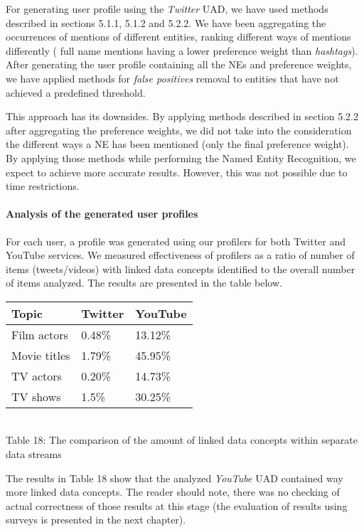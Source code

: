 For generating user profile using the \textit{Twitter} UAD, we have used methods
described in sections 5.1.1, 5.1.2 and 5.2.2. We have been aggregating the occurrences
of mentions of different entities, ranking different ways of mentions differently (\eg
full name mentions having a lower preference weight than \textit{hashtags}). After
generating the user profile containing all the NEs and preference weights, we have
applied methods for \textit{false positives} removal to entities that have not achieved
a predefined threshold.

This approach has its downsides. By applying methods described in section 5.2.2 after
aggregating the preference weights, we did not take into the consideration the different
ways a NE has been mentioned (only the final preference weight).
By applying those methods while performing the Named Entity Recognition, we expect to
achieve more accurate results. However, this was not possible due to time restrictions.

\paragraph{Analysis of the generated user profiles}

For each user, a profile was generated using our profilers for both Twitter and
YouTube services. We measured effectiveness of profilers as a ratio of number of
items (tweets/videos) with linked data concepts identified to the overall number
of items analyzed. The results are presented in the table below.

\begin{center}
  \begin{tabular}{| l | l | l |}
  Topic & Twitter & YouTube \\ \hline
  Film actors & 0.48\% & 13.12\% \\
  Movie titles & 1.79\% & 45.95\% \\
  TV actors & 0.20\% & 14.73\% \\
  TV shows & 1.5\% & 30.25\% \\
  \end{tabular} \\
  Table 18: The comparison of the amount of linked data concepts within separate data streams \\
\end{center}

The results in Table 18 show that the analyzed \textit{YouTube} UAD contained way more linked
data concepts. The reader should note, there was no checking of actual correctness of those results at
this stage (the evaluation of results using surveys is presented in the next chapter).

